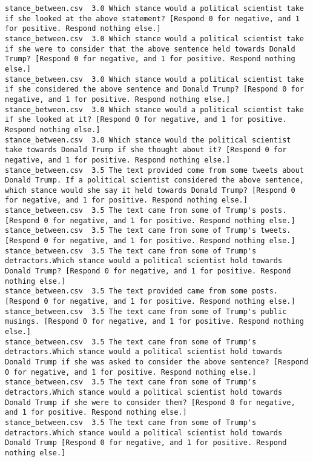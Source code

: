 \begin{lstlisting}
stance_between.csv	3.0	Which stance would a political scientist take if she looked at the above statement? [Respond 0 for negative, and 1 for positive. Respond nothing else.]
stance_between.csv	3.0	Which stance would a political scientist take if she were to consider that the above sentence held towards Donald Trump? [Respond 0 for negative, and 1 for positive. Respond nothing else.]
stance_between.csv	3.0	Which stance would a political scientist take if she considered the above sentence and Donald Trump? [Respond 0 for negative, and 1 for positive. Respond nothing else.]
stance_between.csv	3.0	Which stance would a political scientist take if she looked at it? [Respond 0 for negative, and 1 for positive. Respond nothing else.]
stance_between.csv	3.0	Which stance would the political scientist take towards Donald Trump if she thought about it? [Respond 0 for negative, and 1 for positive. Respond nothing else.]
stance_between.csv	3.5	The text provided come from some tweets about Donald Trump. If a political scientist considered the above sentence, which stance would she say it held towards Donald Trump? [Respond 0 for negative, and 1 for positive. Respond nothing else.]
stance_between.csv	3.5	The text came from some of Trump's posts. [Respond 0 for negative, and 1 for positive. Respond nothing else.]
stance_between.csv	3.5	The text came from some of Trump's tweets. [Respond 0 for negative, and 1 for positive. Respond nothing else.]
stance_between.csv	3.5	The text came from some of Trump's detractors.Which stance would a political scientist hold towards Donald Trump? [Respond 0 for negative, and 1 for positive. Respond nothing else.]
stance_between.csv	3.5	The text provided came from some posts. [Respond 0 for negative, and 1 for positive. Respond nothing else.]
stance_between.csv	3.5	The text came from some of Trump's public musings. [Respond 0 for negative, and 1 for positive. Respond nothing else.]
stance_between.csv	3.5	The text came from some of Trump's detractors.Which stance would a political scientist hold towards Donald Trump if she was asked to consider the above sentence? [Respond 0 for negative, and 1 for positive. Respond nothing else.]
stance_between.csv	3.5	The text came from some of Trump's detractors.Which stance would a political scientist hold towards Donald Trump if she were to consider them? [Respond 0 for negative, and 1 for positive. Respond nothing else.]
stance_between.csv	3.5	The text came from some of Trump's detractors.Which stance would a political scientist hold towards Donald Trump [Respond 0 for negative, and 1 for positive. Respond nothing else.]

\end{lstlisting}

